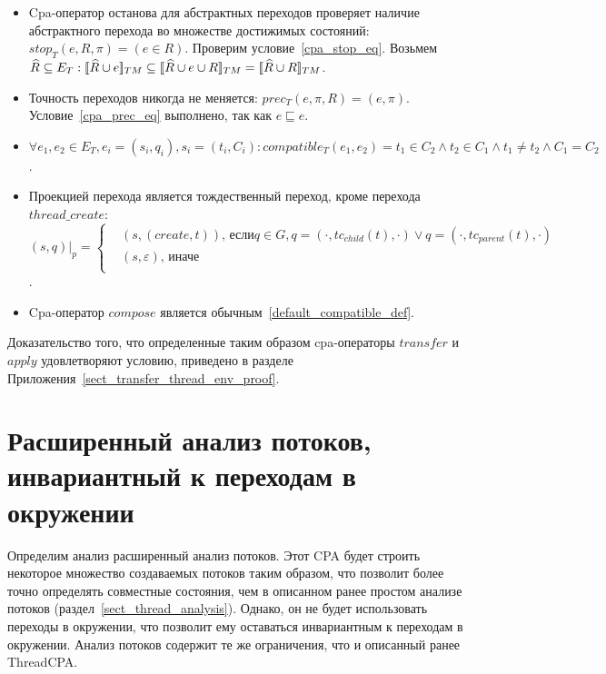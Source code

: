 \begin{itemize}
\item Cpa-оператор останова для абстрактных переходов проверяет наличие абстрактного перехода во множестве достижимых состояний: $stop_T(e, R, \pi) = (e \in R)$.
Проверим условие~\ref{cpa_stop_eq}.
Возьмем $\widehat{R} \subseteq E_T: [\![ \widehat{R} \cup e ]\!]_{TM} \subseteq [\![ \widehat{R} \cup e \cup R ]\!]_{TM} = [\![ \widehat{R} \cup R ]\!]_{TM}$.

\item Точность переходов никогда не меняется: $prec_T(e, \pi, R) = (e, \pi)$. Условие~\ref{cpa_prec_eq} выполнено, так как $e \sqsubseteq e$.

\item $\forall e_1, e_2 \in E_T, e_i = (s_i, q_i), s_i = (t_i, C_i):compatible_T(e_1,e_2) = t_1 \in C_2 \land t_2 \in C_1  \land t_1 \neq t_2 \land C_1 = C_2$.

\item 
Проекцией перехода является тождественный переход, кроме перехода $thread\_create$:
$(s, q)|_p = 
\begin{cases}
&(s, (create, t)) \mbox{, если} q \in G, q = (\cdot, tc_{child}(t), \cdot) \lor q = (\cdot, tc_{parent}(t), \cdot) \\
&(s, \varepsilon) \mbox{, иначе} \\
\end{cases}$.

\item Cpa-оператор $compose$ является обычным~\ref{default_compatible_def}.
\end{itemize}

Доказательство того, что определенные таким образом cpa-операторы $transfer$ и $apply$ удовлетворяют условию, приведено в разделе Приложения~\ref{sect_transfer_thread_env_proof}. 


\section{Расширенный анализ потоков, инвариантный к переходам в окружении}
\label{sect_thread_analysis_ext}

Определим анализ расширенный анализ потоков.
Этот CPA будет строить некоторое множество создаваемых потоков таким образом, что позволит более точно определять совместные состояния, чем в описанном ранее простом анализе потоков (раздел~\ref{sect_thread_analysis}). 
Однако, он не будет использовать переходы в окружении, что позволит ему оставаться инвариантным к переходам в окружении.
Анализ потоков содержит те же ограничения, что и описанный ранее ThreadCPA.

